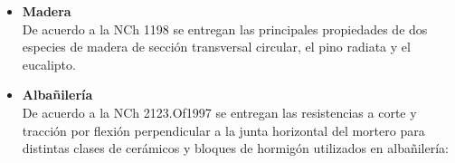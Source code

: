\begin{itemize}
    
    \item \textbf{Madera}\\
    De acuerdo a la NCh 1198 se entregan las principales propiedades de dos especies de madera de sección transversal circular, el pino radiata y el eucalipto.
    
    \begin{table}[H]
      \centering
      \caption{Tensiones admisibles y módulo de elasticidad para piezas estructurales de madera.}
      \label{madera}%
    \end{table}%

    
    \item \textbf{Albañilería}\\ 
    De acuerdo a la NCh 2123.Of1997 se entregan las resistencias a corte y tracción por flexión perpendicular a la junta horizontal del mortero para distintas clases de cerámicos y bloques de hormigón utilizados en albañilería:
    

\end{itemize}
